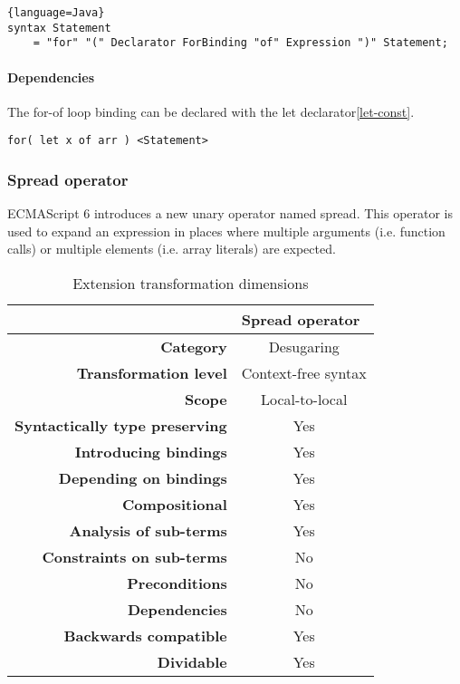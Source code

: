\documentclass[10pt,a4paper]{article}
\begin{document}
\begin{lstlisting}{language=Java}
syntax Statement 
	= "for" "(" Declarator ForBinding "of" Expression ")" Statement;
\end{lstlisting}
    
\paragraph{Dependencies}
The for-of loop binding can be declared with the let declarator\ref{let-const}.

\begin{lstlisting}
for( let x of arr ) <Statement>
\end{lstlisting}


\subsubsection{Spread operator}
ECMAScript 6 introduces a new unary operator named spread\cite[12.3.6.1]{SpecJS}. This operator is used to expand an expression in places where multiple arguments (i.e. function calls) or multiple elements (i.e. array literals) are expected.

\begin{table}[H]
\centering
\caption{Extension transformation dimensions}
\label{spread-oeprator-table}
\begin{tabular}{@{}rc@{}}
\toprule
                                       & \multicolumn{1}{l}{\textbf{Spread operator}} \\ \midrule
\textbf{Category}                      & Desugaring
\\
\textbf{Transformation level}          & Context-free syntax                          \\
\textbf{Scope}                         & Local-to-local                               \\
\textbf{Syntactically type preserving} & Yes                                          \\
\textbf{Introducing bindings}          & Yes                                          \\%
\textbf{Depending on bindings}         & Yes                                           \\
\textbf{Compositional}                 & Yes                                          \\
\textbf{Analysis of sub-terms}          & Yes                                          \\
\textbf{Constraints on sub-terms}       & No                                           \\
\textbf{Preconditions}                 & No                                          \\
\textbf{Dependencies}                  & No                                           \\
\textbf{Backwards compatible}          & Yes                                          \\
\textbf{Dividable}                     & Yes                                           \\ \bottomrule
\end{tabular}
\end{table}
\end{document}

